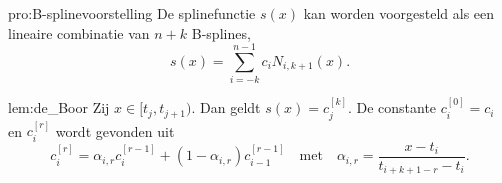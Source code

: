 \begin{pro}{pro:B-splinevoorstelling}
    De splinefunctie $s(x)$ kan worden voorgesteld als een lineaire combinatie van $n+k$ B-splines,
    \begin{equation*}
        s(x) = \sum_{i=-k}^{n-1} c_i N_{i,k+1}(x).
    \end{equation*}
    \vspace{-0.3cm}
\end{pro}

\begin{lem}[de Boor]{lem:de_Boor}
    Zij $x\in[t_j,t_{j+1})$. Dan geldt $s(x) = c_j^{[k]}$. De constante $c_i^{[0]} = c_i$ en $c_i^{[r]}$ wordt gevonden uit 
    \begin{equation*}
        c_i^{[r]} = \alpha_{i,r} c_i^{[r-1]} + (1-\alpha_{i,r})c_{i-1}^{[r-1]} \quad \text{met} \quad \alpha_{i,r} = \frac{x-t_i}{t_{i+k+1-r}-t_i}.
    \end{equation*}
    \vspace{-0.2cm}
\end{lem}

